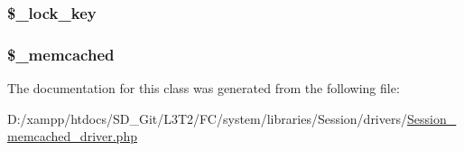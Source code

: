 \subsubsection[{\$\+\_\+lock\+\_\+key}]{\setlength{\rightskip}{0pt plus 5cm}\$\+\_\+lock\+\_\+key\hspace{0.3cm}{\ttfamily [protected]}}\label{class_c_i___session__memcached__driver_a79bf61cb0768c7bb23404280ae004fb4}
\hypertarget{class_c_i___session__memcached__driver_a9ce5188201bbc41ed4374947a35dadcc}{}
\subsubsection[{\$\+\_\+memcached}]{\setlength{\rightskip}{0pt plus 5cm}\$\+\_\+memcached\hspace{0.3cm}{\ttfamily [protected]}}\label{class_c_i___session__memcached__driver_a9ce5188201bbc41ed4374947a35dadcc}


The documentation for this class was generated from the following file\+:\begin{DoxyCompactItemize}
\item 
D\+:/xampp/htdocs/\+S\+D\+\_\+\+Git/\+L3\+T2/\+F\+C/system/libraries/\+Session/drivers/\hyperlink{_session__memcached__driver_8php}{Session\+\_\+memcached\+\_\+driver.\+php}\end{DoxyCompactItemize}
